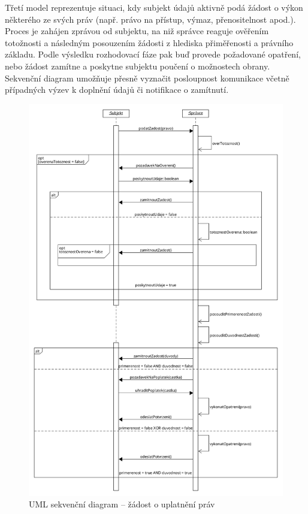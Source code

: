 \begin{itemize}
  Třetí model reprezentuje situaci, kdy subjekt údajů aktivně podá žádost o výkon některého ze svých práv (např. právo na přístup, výmaz, přenositelnost apod.). Proces je zahájen zprávou od subjektu, na niž správce reaguje ověřením totožnosti a následným posouzením žádosti z hlediska přiměřenosti a právního základu. Podle výsledku rozhodovací fáze pak buď provede požadované opatření, nebo žádost zamítne a poskytne subjektu poučení o možnostech obrany. Sekvenční diagram umožňuje přesně vyznačit posloupnost komunikace včetně případných výzev k doplnění údajů či notifikace o zamítnutí.

  \begin{figure}[H]
    \centering
    \includegraphics[width=\textwidth]{images/UML_sekvence_zadost.png}
    \caption{UML sekvenční diagram – žádost o uplatnění práv}
    \label{fig:uml_sekvence_zadost}
  \end{figure}

\end{itemize}



